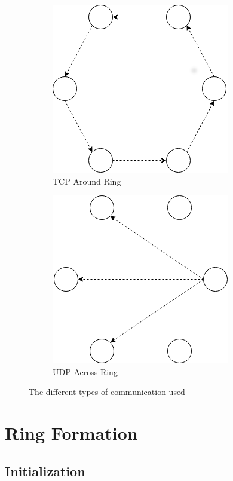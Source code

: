 \documentclass[12pt]{article}
\begin{document}
\begin{figure}[!h]
\centering
\begin{subfigure}{.5\textwidth}
  \centering
  \includegraphics[width=.6\linewidth]{images/tcp}
  \caption{TCP Around Ring}
  \label{fig:tcp}
\end{subfigure}%
\begin{subfigure}{.5\textwidth}
  \centering
  \includegraphics[width=.6\linewidth]{images/udp}
  \caption{UDP Across Ring}
  \label{fig:udp}
\end{subfigure}
\caption{The different types of communication used}
\label{fig:pattern}
\end{figure}

\section{Ring Formation}

\subsection{Initialization}
\end{document}
